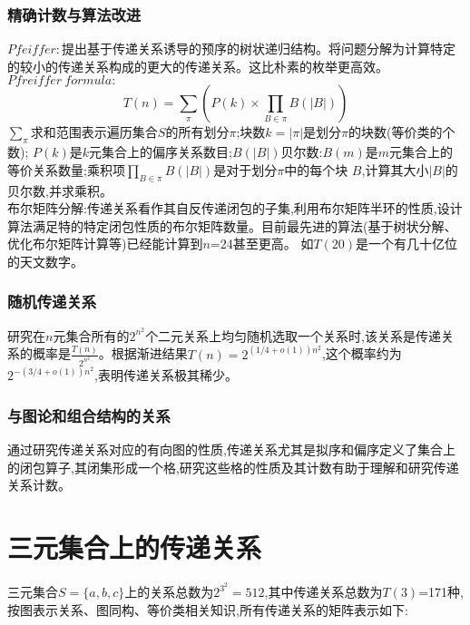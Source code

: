 \documentclass[12pt]{article}
\theoremstyle{definition}
\begin{document}
\subsubsection{精确计数与算法改进}
$Pfeiffer:$提出基于传递关系诱导的预序的树状递归结构。将问题分解为计算特定的较小的传递关系构成的更大的传递关系。这比朴素的枚举更高效。\\
$Pfreiffer\ formula:$\\
\[
T(n)=\sum_{\pi}^{}(P(k)\times \prod_{B\in \pi}^{} B(\left | B \right | ))
\]
\hspace*{2em}$\sum_{\pi}^{}$求和范围表示遍历集合$S$的所有划分$\pi$;块数$k=\left | \pi \right |$是划分$\pi$的块数(等价类的个数);
$P(k)$是$k$元集合上的偏序关系数目;$B(\left | B \right |)$贝尔数:$B(m)$是$m$元集合上的等价关系数量;乘积项$\prod_{B \in \pi}^{}B(\left | B \right |)$是对于划分$\pi$中的每个块
$B$,计算其大小$\left | B \right |$的贝尔数,并求乘积。\\
\hspace*{2em}布尔矩阵分解:传递关系看作其自反传递闭包的子集,利用布尔矩阵半环的性质,设计算法满足特的特定闭包性质的布尔矩阵数量。目前最先进的算法(基于树状分解、优化布尔矩阵计算等)已经能计算到$n$=24甚至更高。
如$T(20)$是一个有几十亿位的天文数字。
\subsubsection{随机传递关系}
研究在$n$元集合所有的$2^{n^{2}}$个二元关系上均匀随机选取一个关系时,该关系是传递关系的概率是$\frac{T(n)}{2^{n^{2}}}$。根据渐进结果$T(n)=2^{(1/4+o(1))n^2}$,这个概率约为
$2^{-(3/4+o(1))n^2}$,表明传递关系极其稀少。
\subsubsection{与图论和组合结构的关系}
通过研究传递关系对应的有向图的性质,传递关系尤其是拟序和偏序定义了集合上的闭包算子,其闭集形成一个格,研究这些格的性质及其计数有助于理解和研究传递关系计数。\\

\newpage
\section{三元集合上的传递关系}
三元集合$S=\{a,b,c\}$上的关系总数为$2^{3^2}=512$,其中传递关系总数为$T(3)$=171种,按图表示关系、图同构、等价类相关知识,所有传递关系的矩阵表示如下:\\
\end{document}
